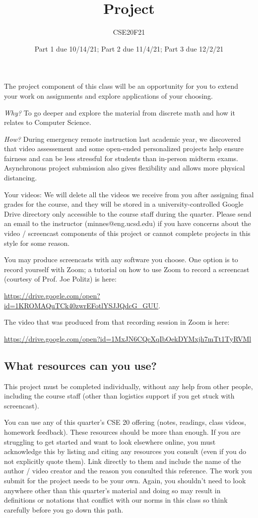 \documentclass[12pt, oneside]{article}
\author{CSE20F21}
\title{Project}
\date{Part 1 due 10/14/21; Part 2 due 11/4/21; Part 3 due 12/2/21}
\begin{document}
\maketitle
\thispagestyle{fancy}
The project component of this class will be an opportunity for you to extend your 
work on assignments and explore applications of your choosing. 

{\it Why?}
To go deeper and explore the material from discrete math and how it relates to Computer Science.

{\it How?} During emergency remote instruction last academic year, we discovered
that video assessement and some open-ended personalized projects help ensure fairness
and can be less stressful for students than in-person midterm exams. Asynchronous project
submission also gives flexibility and allows more physical distancing.

Your videos: We will delete all the videos we receive from you after assigning final grades for the course, 
and they will be stored in a university-controlled Google Drive directory 
only accessible to the course staff during the quarter. 
Please send an email to the instructor (minnes@eng.ucsd.edu) if you have 
concerns about 
the video / screencast components of this project or cannot complete projects in this style for some reason.

You may produce screencasts with any software you choose. 
One option is to record yourself with Zoom; a tutorial on how to use Zoom to record a 
screencast (courtesy of Prof. Joe Politz)  is here: 

\url{https://drive.google.com/open?id=1KROMAQuTCk40zwrEFotlYSJJQdcG_GUU}.

The video that was produced from that recording session in Zoom is here:

\url{https://drive.google.com/open?id=1MxJN6CQcXqIbOekDYMxjh7mTt1TyRVMl}

\subsection*{What resources can you use?}
This project must be completed individually, without any help from other people, 
including the course staff (other than logistics support if you get stuck with screencast). 

You can use any of this quarter's CSE 20 offering (notes, readings, class videos, homework feedback). 
These resources should be more than enough. If you are struggling to get started and want to 
look elsewhere online, you must acknowledge this by listing and citing any resources you consult 
(even if you do not explicitly quote them). Link directly to them and include the name of the 
author / video creator and the reason you consulted this reference. The work you submit for 
the project needs to be your own. Again, you shouldn't need to look anywhere other 
than this quarter's material and doing so may result in definitions or notations 
that conflict with our norms in this class so think carefully before you go down this path.
\end{document}
